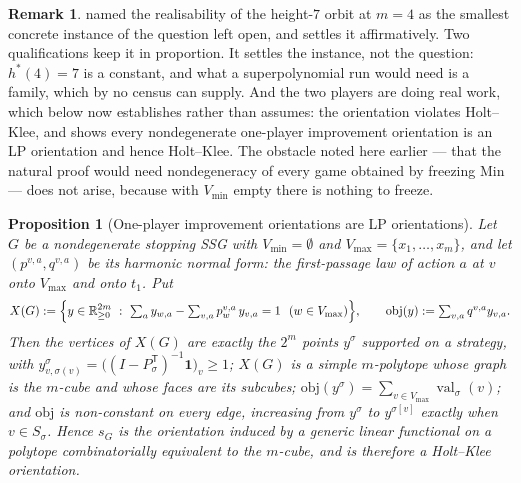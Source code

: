 \documentclass[11pt]{article}
\theoremstyle{plain}
\newtheorem{proposition}[theorem]{Proposition}
\theoremstyle{definition}
\newtheorem{remark}[theorem]{Remark}
\DeclareMathOperator{\val}{val}
\newcommand{\Vmax}{V_{\max}}
\newcommand{\Vmin}{V_{\min}}
\newcommand{\bbone}{\mathbf{1}}
\begin{document}
\begin{remark}\label{rem:auso-seven}
 named the realisability of the height-$7$ orbit at
$m=4$ as the smallest concrete instance of the question left open, and
 settles it affirmatively. Two qualifications keep
it in proportion. It settles the instance, not the question: $h^{\ast}(4)=7$
is a constant, and what a superpolynomial run would need is a family, which
by  no census can supply. And the two players are doing real work, which
 below now establishes rather than assumes: the
orientation violates Holt--Klee, and  shows every
nondegenerate one-player improvement orientation is an LP orientation and
hence Holt--Klee. The obstacle noted here earlier --- that the natural proof
would need nondegeneracy of every game obtained by freezing Min --- does not
arise, because with $\Vmin$ empty there is nothing to freeze.
\end{remark}

\begin{proposition}[One-player improvement orientations are LP orientations]\label{prop:oneplayer-lp}
Let $G$ be a nondegenerate stopping SSG with $\Vmin=\emptyset$ and
$\Vmax=\{x_1,\dots,x_m\}$, and let $(p^{v,a},q^{v,a})$ be its harmonic
normal form: the first-passage law of action $a$ at $v$ onto $\Vmax$ and
onto $t_1$. Put
\[
  X(G):=\Bigl\{y\in\mathbb R^{2m}_{\ge0}\ :\
    \textstyle\sum_a y_{w,a}-\sum_{v,a}p^{v,a}_{w}\,y_{v,a}=1\ \ (w\in\Vmax)\Bigr\},
  \qquad \mathrm{obj}(y):=\sum_{v,a}q^{v,a}y_{v,a}.
\]
Then the vertices of $X(G)$ are exactly the $2^{m}$ points $y^{\sigma}$
supported on a strategy, with
$y^{\sigma}_{v,\sigma(v)}=\bigl((I-P_\sigma^{\mathsf T})^{-1}\bbone\bigr)_v\ge1$;
$X(G)$ is a simple $m$-polytope whose graph is the $m$-cube and whose faces
are its subcubes; $\mathrm{obj}(y^{\sigma})=\sum_{v\in\Vmax}\val_\sigma(v)$; and
$\mathrm{obj}$ is non-constant on every edge, increasing from $y^{\sigma}$ to
$y^{\sigma[v]}$ exactly when $v\in S_\sigma$. Hence $s_G$ is the orientation
induced by a generic linear functional on a polytope combinatorially
equivalent to the $m$-cube, and is therefore a Holt--Klee orientation.
\end{proposition}
\end{document}
